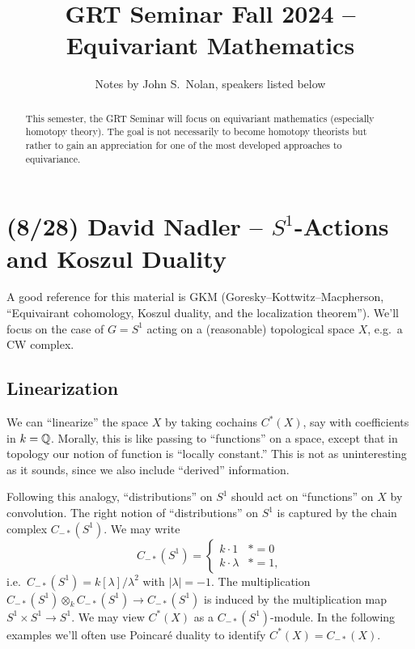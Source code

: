 \documentclass{article}
\title{GRT Seminar Fall 2024 -- Equivariant Mathematics}
\author{Notes by John S.\ Nolan, speakers listed below}
\begin{document}
\maketitle

\begin{abstract}
	This semester, the GRT Seminar will focus on equivariant mathematics (especially homotopy theory).
  The goal is not necessarily to become homotopy theorists but rather to gain an appreciation for one of the most developed approaches to equivariance.
\end{abstract}

\tableofcontents

\section{(8/28) David Nadler -- $S^1$-Actions and Koszul Duality}

A good reference for this material is GKM (Goresky--Kottwitz--Macpherson, ``Equivairant cohomology, Koszul duality, and the localization theorem'').
We'll focus on the case of $G = S^1$ acting on a (reasonable) topological space $X$, e.g.\ a CW complex.

\subsection{Linearization}

We can ``linearize'' the space $X$ by taking cochains $C^*(X)$, say with coefficients in $k = \mathbb{Q}$.
Morally, this is like passing to ``functions'' on a space, except that in topology our notion of function is ``locally constant.''
This is not as uninteresting as it sounds, since we also include ``derived'' information.

Following this analogy, ``distributions'' on $S^1$ should act on ``functions'' on $X$ by convolution.
The right notion of ``distributions'' on $S^1$ is captured by the chain complex $C_{-*}(S^1)$.
We may write
\[
  C_{-*}(S^1) = \begin{cases}
    k \cdot 1 & * = 0 \\
    k \cdot \lambda & * = 1,
  \end{cases}
\]
i.e.\ $C_{-*}(S^1) = k[\lambda] / \lambda^2$ with $|\lambda| = -1$.
The multiplication $C_{-*}(S^1) \otimes_k C_{-*}(S^1) \to C_{-*}(S^1)$ is induced by the multiplication map $S^1 \times S^1 \to S^1$.
We may view $C^*(X)$ as a $C_{-*}(S^1)$-module.
In the following examples we'll often use Poincar\'e duality to identify $C^*(X) = C_{-*}(X)$.
\end{document}
